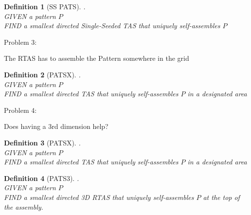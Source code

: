 \documentclass[12pt]{article}
\newtheorem{definition}{Definition}
\begin{document}
\begin{definition}[SS PATS]. \\
    GIVEN a pattern $P$ \\
    FIND a smallest directed Single-Seeded TAS that uniquely self-assembles $P$
\end{definition}


Problem 3: 

The RTAS has to assemble the Pattern somewhere in the grid

\begin{definition}[PATSX]. \\
    GIVEN a pattern $P$ \\
    FIND a smallest directed TAS that uniquely self-assembles $P$ in a designated area
\end{definition}

Problem 4: 

Does having a 3rd dimension help? 

\begin{definition}[PATSX]. \\
    GIVEN a pattern $P$ \\
    FIND a smallest directed TAS that uniquely self-assembles $P$ in a designated area
\end{definition}

\begin{definition}[PATS3]. \\
    GIVEN a pattern $P$ \\
    FIND a smallest directed 3D RTAS that uniquely self-assembles $P$ at the top of the assembly.
\end{definition}
\end{document}
